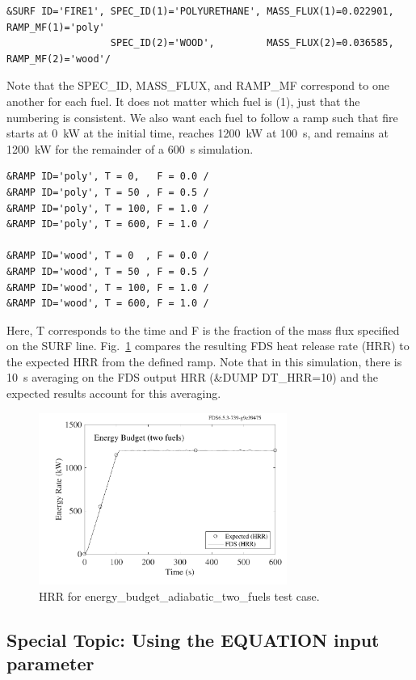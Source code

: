 \documentclass[11pt]{book}
\begin{document}
\begin{lstlisting}
&SURF ID='FIRE1', SPEC_ID(1)='POLYURETHANE', MASS_FLUX(1)=0.022901, RAMP_MF(1)='poly'
                  SPEC_ID(2)='WOOD',         MASS_FLUX(2)=0.036585, RAMP_MF(2)='wood'/
\end{lstlisting}
Note that the {\ct SPEC\_ID}, {\ct MASS\_FLUX}, and {\ct RAMP\_MF} correspond to one another for each fuel. It does not matter which fuel is {\ct (1)}, just that the numbering is consistent. We also want each fuel to follow a ramp such that fire starts at 0~kW at the initial time, reaches 1200~kW at 100~s, and remains at 1200~kW for the remainder of a 600~s simulation.
\begin{lstlisting}
&RAMP ID='poly', T = 0,   F = 0.0 /
&RAMP ID='poly', T = 50 , F = 0.5 /
&RAMP ID='poly', T = 100, F = 1.0 /
&RAMP ID='poly', T = 600, F = 1.0 /

&RAMP ID='wood', T = 0  , F = 0.0 /
&RAMP ID='wood', T = 50 , F = 0.5 /
&RAMP ID='wood', T = 100, F = 1.0 /
&RAMP ID='wood', T = 600, F = 1.0 /
\end{lstlisting}
Here, {\ct T} corresponds to the time and {\ct F} is the fraction of the mass flux specified on the {\ct SURF} line. Fig.~\ref{fig:hrr_two_fuels} compares the resulting FDS heat release rate (HRR) to the expected HRR from the defined ramp. Note that in this simulation, there is 10~s averaging on the FDS output HRR ({\ct \&DUMP DT\_HRR=10}) and the expected results account for this averaging.

\begin{figure}[ht]
\centering
\includegraphics[width=3.2in]{SCRIPT_FIGURES/energy_budget_adiabatic_two_fuels}
\caption[HRR for {\ct energy\_budget\_adiabatic\_two\_fuels} test case]{HRR for {\ct energy\_budget\_adiabatic\_two\_fuels} test case.}
\label{fig:hrr_two_fuels}
\end{figure}


\subsection{Special Topic: Using the {\ct EQUATION} input parameter}
\label{info:EQUATION}
\end{document}
